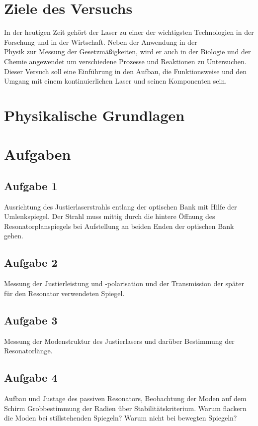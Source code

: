 \documentclass[a4paper, parskip=half]{scrartcl}
\begin{document}
\myTitlepage
\tableofcontents

\section{Ziele des Versuchs}

In der heutigen Zeit gehört der Laser zu einer der wichtigsten Technologien in der Forschung und in der Wirtschaft. Neben der Anwendung in der\\
Physik zur Messung der Gesetzmäßigkeiten, wird er auch in der Biologie und der Chemie angewendet um verschiedene Prozesse und Reaktionen zu Untersuchen. Dieser Versuch soll eine Einführung in den Aufbau, die Funktionsweise und den Umgang mit einem kontinuierlichen Laser und seinen Komponenten sein.

\section{Physikalische Grundlagen}


\newpage
\section{Aufgaben}

\subsection*{Aufgabe 1}
Ausrichtung des Justierlaserstrahls entlang der optischen Bank mit Hilfe der Umlenkspiegel. Der Strahl muss mittig durch die hintere Öffnung des Resonatorplanspiegels bei Aufstellung an beiden Enden der optischen Bank gehen.

\subsection*{Aufgabe 2}
Messung der Justierleistung und -polarisation und der Transmission der später für den Resonator verwendeten Spiegel.

\subsection*{Aufgabe 3}
Messung der Modenstruktur des Justierlasers und darüber Bestimmung der Resonatorlänge.

\subsection*{Aufgabe 4}
Aufbau und Justage des passiven Resonators, Beobachtung der Moden auf dem Schirm Grobbestimmung der Radien über Stabilitätskriterium. Warum flackern die Moden bei stillstehenden Spiegeln? Warum nicht bei bewegten Spiegeln?
\end{document}
